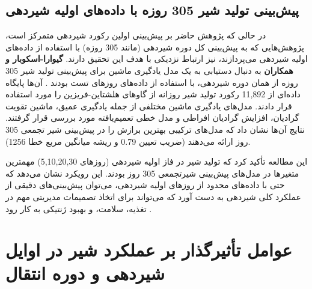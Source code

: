 \subsection*{پیش‌بینی تولید شیر 305 روزه با داده‌های اولیه شیردهی}
در حالی که پژوهش حاضر بر پیش‌بینی اولین رکورد شیردهی متمرکز است، پژوهش‌هایی که به پیش‌بینی کل دوره شیردهی (مانند 305 روزه) با استفاده از داده‌های اولیه شیردهی می‌پردازند، نیز ارتباط نزدیکی با هدف این تحقیق دارند.
\textbf{گیوارا-اسکوبار و همکاران} به دنبال دستیابی به یک مدل یادگیری ماشین برای پیش‌بینی تولید شیر 305	روزه از همان دوره شیردهی، با استفاده از داده‌های روزهای تست بودند \cite{GuevaraEscobar2022}. 
آن‌ها پایگاه داده‌ای از 11,892 رکورد تولید شیر روزانه از گاوهای هلشتاین-فریزین را مورد استفاده قرار دادند. مدل‌های یادگیری ماشین مختلفی از جمله یادگیری عمیق، ماشین تقویت گرادیان، افزایش گرادیان افراطی و مدل خطی تعمیم‌یافته مورد بررسی قرار گرفتند. نتایج آن‌ها نشان داد که مدل‌های ترکیبی بهترین برازش را در پیش‌بینی شیر تجمعی 305 روز ارائه می‌دهند (ضریب تعیین \num{0,79} و ریشه میانگین مربع خطا 1256).

این مطالعه تأکید کرد که تولید شیر در فاز اولیه شیردهی (روزهای 5,10,20,30) مهمترین متغیرها در مدل‌های پیش‌بینی شیرتجمعی 305 روز بودند. این رویکرد نشان می‌دهد که حتی با داده‌های محدود از روزهای اولیه شیردهی، می‌توان پیش‌بینی‌های دقیقی از عملکرد کلی شیردهی به دست آورد که می‌تواند برای اتخاذ تصمیمات مدیریتی مهم در تغذیه، سلامت، و بهبود ژنتیکی به کار رود \cite{GuevaraEscobar2022}.
	
\section{عوامل تأثیرگذار بر عملکرد شیر در اوایل شیردهی و دوره انتقال}

